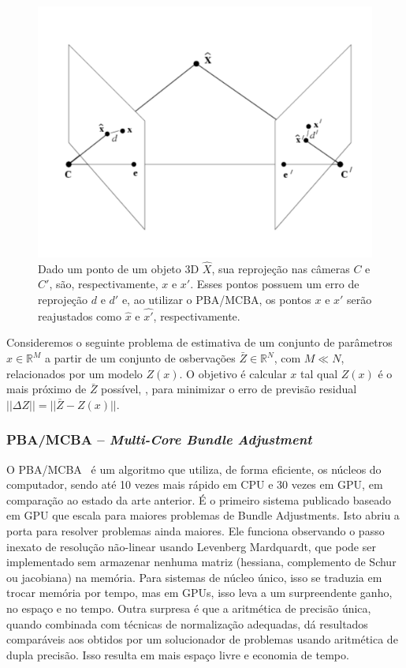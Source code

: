 \begin{figure}[!h]
	\centering
	\includegraphics[width=0.5\linewidth]{figs/bundleAdjustment.png}
	\caption{
	Dado um ponto de um objeto 3D $\widehat{X}$, sua reprojeção nas câmeras $C$ e
  $C'$, são, respectivamente, $x$ e $x'$. Esses pontos possuem um erro de
  reprojeção $d$ e $d'$ e, ao utilizar o PBA/MCBA, os pontos $x$ e $x'$ serão
  reajustados como $\widehat{x}$ e $\widehat{x'}$, respectivamente.
  \protect\cite{3DCompVision2Didier}
	}\label{fig:bundleAdjustment}
\end{figure}

Consideremos o seguinte problema de estimativa de um conjunto de parâmetros $x
\in \mathbb{R}^M$ a partir de um conjunto de osbervações $\bar{Z} \in \mathbb{R}^N$, com
$M \ll N$, relacionados por um modelo $Z(x)$. O objetivo é calcular $x$ tal qual $Z(x)$ é o mais próximo de
$\bar{Z}$ possível, \ie, para minimizar o erro de previsão residual $|| \Delta Z
|| = || \bar{Z} - Z(x) ||$.

\subsubsection*{PBA/MCBA -- \emph{Multi-Core Bundle Adjustment}}\label{pba}

O PBA/MCBA~\cite{furukawa2009accurate,wu2011multicore} é um algoritmo que
utiliza, de forma eficiente, os núcleos do computador, sendo até 10 vezes mais
rápido em CPU e 30 vezes em GPU, em comparação ao estado da arte anterior. É o primeiro
sistema publicado baseado em GPU que escala para maiores problemas de Bundle
Adjustments. Isto abriu a porta para resolver problemas ainda maiores. Ele
funciona observando o passo inexato de resolução não-linear usando Levenberg
Mardquardt, que pode ser implementado sem armazenar nenhuma matriz (hessiana,
complemento de Schur ou jacobiana) na memória. Para sistemas de núcleo único,
isso se traduzia em trocar memória por tempo, mas em GPUs, isso leva a um
surpreendente ganho, no espaço e no tempo. Outra surpresa é que a aritmética de
precisão única, quando combinada com técnicas de normalização adequadas, dá
resultados comparáveis aos obtidos por um solucionador de problemas usando
aritmética de dupla precisão. Isso resulta em mais espaço livre e economia de tempo.

